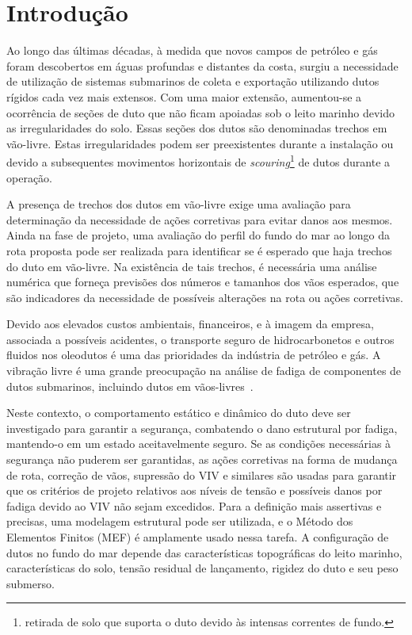\chapter{Introdução}


Ao longo das últimas décadas, à medida que novos campos de petróleo e gás foram descobertos em águas profundas e distantes da costa, surgiu a necessidade de utilização de sistemas submarinos de coleta e exportação utilizando dutos rígidos cada vez mais extensos.
Com uma maior extensão, aumentou-se a ocorrência de seções de duto que não ficam apoiadas sob o leito marinho devido as irregularidades do solo. Essas seções dos dutos são denominadas trechos em vão-livre. Estas irregularidades podem ser preexistentes durante a instalação ou devido a subsequentes movimentos horizontais de \textit{scouring}\footnote{retirada de solo que suporta o duto devido às intensas correntes de fundo.} de dutos durante a operação.

A presença de trechos dos dutos em vão-livre exige uma avaliação para determinação da necessidade de ações corretivas para evitar danos aos mesmos.
Ainda na fase de projeto, uma avaliação do perfil do fundo do mar ao longo da rota proposta pode ser realizada para identificar se é esperado que haja trechos do duto em vão-livre.
Na existência de tais trechos, é necessária uma análise numérica que forneça previsões dos números e tamanhos dos vãos esperados, que são indicadores da necessidade de possíveis alterações na rota ou ações corretivas.

Devido aos elevados custos ambientais, financeiros, e à imagem da empresa, associada a possíveis acidentes, o transporte seguro de hidrocarbonetos e outros fluidos nos oleodutos é uma das prioridades da indústria de petróleo e gás.
A vibração livre é uma grande preocupação na análise de fadiga de componentes de dutos submarinos, incluindo dutos em vãos-livres~\cite{Gamino2013}.

Neste contexto, o comportamento estático e dinâmico do duto deve ser investigado para garantir a segurança, combatendo o dano estrutural por fadiga, mantendo-o em um estado aceitavelmente seguro.
Se as condições necessárias à segurança não puderem ser garantidas, as ações corretivas na forma de mudança de rota, correção de vãos, supressão do VIV e similares são usadas para garantir que os critérios de projeto relativos aos níveis de tensão e possíveis danos por fadiga devido ao VIV não sejam excedidos.
Para a definição mais assertivas e precisas, uma modelagem estrutural pode ser utilizada, e o Método dos Elementos Finitos (MEF) é amplamente usado nessa tarefa.
A configuração de dutos no fundo do mar depende das características topográficas do leito marinho, características do solo, tensão residual de lançamento, rigidez do duto e seu peso submerso.

